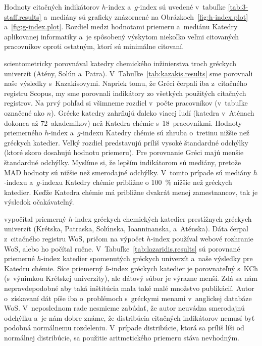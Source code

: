 Hodnoty citačných indikátorov $h$-index a~$g$-index sú uvedené v~tabuľke
\ref{tab:3-staff.results} a~mediány sú graficky znázornené na
Obrázkoch~\ref{fig:h-index.plot} a~\ref{fig:g-index.plot}.  Rozdiel medzi
hodnotami priemeru a~mediánu Katedry aplikovanej informatiky a~je spôsobený
výskytom niekoľko veľmi citovaných pracovníkov oproti ostatným, ktorí sú
minimálne citovaní.

\citet{Kazakis2015} scientometricky porovnával katedry chemického inžinierstva
troch gréckych univerzít (Atény, Solún a~Patra).
V~Tabuľke~\ref{tab:kazakis.results} sme porovnali naše výsledky s~Kazakisovymi.
Napriek tomu, že Gréci čerpali iba z~citačného registru Scopus, my sme porovnali
indikátory zo všetkých použitých citačných registrov.  Na prvý pohľad si
všimneme rozdiel v~počte pracovníkov (v~tabuľke označené ako $n$).  Grécke
katedry zahrňujú ďaleko viacej ľudí (katedra v~Aténach dokonca až 72~akademikov)
než Katedra chémie s~18~pracovníkmi.  Hodnoty priemerného $h$-index a~$g$-indexu
Katedry chémie sú zhruba o~tretinu nižšie než gréckych katedier.  Veľký rozdiel
predstavujú príliš vysoké štandardné odchýlky (ktoré skoro dosahujú hodnotu
priemeru).  Pre porovnanie Gréci majú menšie štandardné odchýlky.  Myslíme si,
že lepším indikátorom sú mediány, pretože MAD hodnoty sú nižšie než smerodajné
odchýlky.  V~tomto prípade sú mediány $h$-indexu a~$g$-indexu Katedry chémie
približne o 100~\% nižšie než gréckych katedier.  Keďže Katedra chémie má
približne dvakrát menej zamestnancov, tak je výsledok očakávateľný.

\citet{Lazaridis2010} vypočítal priemerný $h$-index gréckych chemických katedier
prestížnych gréckych univerzít (Krétska, Patraska, Solúnska, Ioanninanska,
a~Aténska).  Dáta čerpal z~citačného registru WoS, pričom na výpočet $h$-index
používal webové rozhranie WoS, alebo ho počítal ručne.
V~Tabuľke~\ref{tab:lazaridis.results} sú porovnané priemerné $h$-index katedier
spomenutých gréckych univerzít a~naše výsledky pre Katedru chémie.  Síce
priemerný $h$-index gréckych katedier je porovnateľný s~KCh (s~výnimkou Krétskej
univerzity), ale dátový súbor je výrazne menší.  Zdá sa nám nepravdepodobné aby
taká inštitúcia mala také malé množstvo publikácií.  Autor o~získavaní dát píše
iba o~problémoch s~gréckymi menami v~anglickej databáze WoS.  V~neposlednom rade
nesmieme zabúdať, že autor neuvádza smerodajnú odchýlku a~je nám dobre známe, že
distribúcia citačných indikátorov nemusí byť podobná normálnemu rozdeleniu.
V~prípade distribúcie, ktorá sa príliš líši od normálnej distribúcie, sa
použitie aritmetického priemeru stáva nevhodným.


